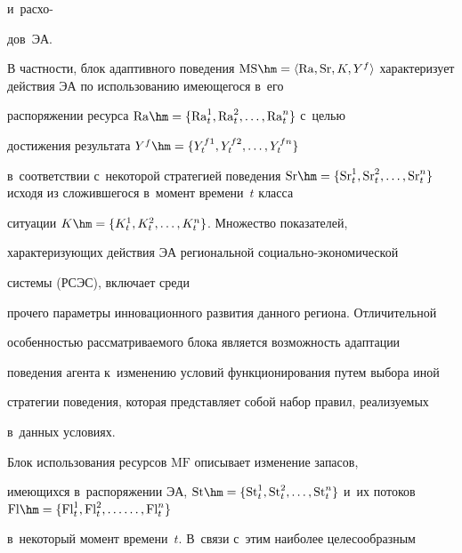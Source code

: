 и~расхо-\linebreak


дов~ЭА. 


  


  В частности, блок адаптивного поведения $\mathrm{MS}\hm= \langle \mathrm{Ra}, \mathrm{Sr}, 


  K,  Y^f\rangle$ характеризует действия ЭА по использованию име\-юще\-го\-ся в~его 


распоряжении ресурса $\mathrm{Ra}\hm= \{ \mathrm{Ra}_t^1, 


\mathrm{Ra}_t^2, \ldots , \mathrm{Ra}_t^n\}$ с~целью 


до\-сти\-же\-ния результата $Y^f\hm= \{ Y_t^{f1}, Y_t^{f2}, \ldots , Y_t^{fn}\}$ 


в~соответствии с~некоторой стратегией поведения $\mathrm{Sr}\hm= \{ \mathrm{Sr}_t^1, 


\mathrm{Sr}_t^2,\ldots , \mathrm{Sr}_t^n\}$ исходя из сложившегося в~момент времени~$t$ класса 


ситуации $K\hm= \{ K_t^1, K_t^2,\ldots ,K_t^n\}$. Множество показателей, 


ха\-рак\-те\-ри\-зу\-ющих действия ЭА региональной со\-ци\-аль\-но-эко\-но\-ми\-че\-ской


системы (РСЭС), включает среди 


прочего па\-ра\-мет\-ры инновационного развития данного региона. Отличительной 


особенностью рассматриваемого блока является воз\-мож\-ность адап\-та\-ции 


поведения агента к~изменению условий функционирования путем выбора иной 


стратегии поведения, которая пред\-став\-ля\-ет собой набор правил, реа\-ли\-зу\-емых 


в~данных условиях. 


  


  Блок использования ресурсов $\mathrm{MF}$ описывает изменение запасов, 


имеющих\-ся в~распоряжении ЭА, $\mathrm{St}\hm= \{ \mathrm{St}_t^1, \mathrm{St}_t^2, 


\ldots, \mathrm{St}_t^n\}$ и~их потоков $\mathrm{Fl}\hm= \{ \mathrm{Fl}_t^1, 


\mathrm{Fl}_t^2,\ldots \linebreak \ldots , \mathrm{Fl}_t^n\}$ 


в~некоторый момент времени~$t$. В~связи с~этим наиболее целесообразным 


